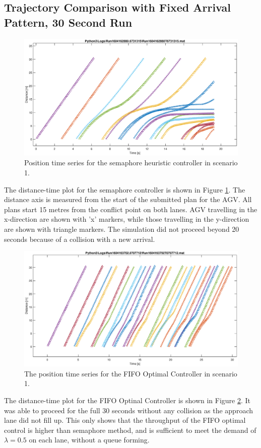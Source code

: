 \documentclass[]{article}
\begin{document}
\subsection{Trajectory Comparison with Fixed Arrival Pattern, 30 Second Run}
\label{sec:fixed_arrival_pattern}
\begin{figure}
	\includegraphics[width=1.0\linewidth]{SemaphoreTracesT6731315.eps}
	\caption{Position time series for the semaphore heuristic controller in scenario 1.}
	\label{fig:semaphore_st}       %
\end{figure}
The distance-time plot for the semaphore controller is shown in Figure \ref{fig:semaphore_st}. The distance axis is measured from the start of the submitted plan for the AGV. All plans start 15 metres from the conflict point on both lanes. AGV travelling in the x-direction are shown with 'x' markers, while those travelling in the y-direction are shown with triangle markers. The simulation did not proceed beyond 20 seconds because of a collision with a new arrival. 

\begin{figure}
	\includegraphics[width=1.0\linewidth]{OptimalFIFOTracesT707712-fixed.eps}
	\caption{The position time series for the FIFO Optimal Controller in scenario 1.}
	\label{fig:optimal_fifo_st}       %
\end{figure}
The distance-time plot for the FIFO Optinal Controller is shown in Figure \ref{fig:optimal_fifo_st}. It was able to proceed for the full 30 seconds without any collision as the approach lane did not fill up. This only shows that the throughput of the FIFO optimal control is higher than semaphore method, and is sufficient to meet the demand of $\lambda=0.5$ on each lane, without a queue forming.   
\end{document}
